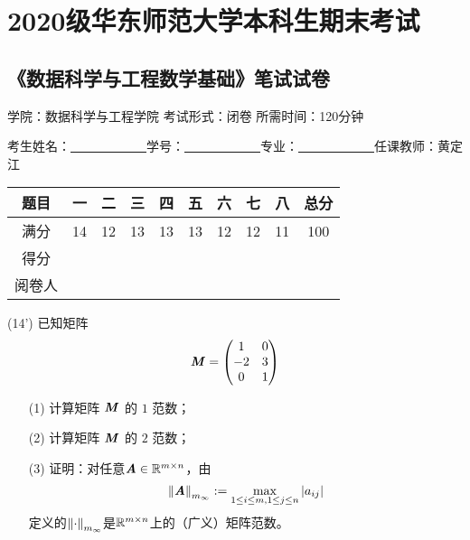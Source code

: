 \documentclass[12pt,a4paper,openany,twoside]{ctexbook}
\begin{document}
\setcounter{chapter}{1}
\chapter*{2020级华东师范大学本科生期末考试}
\section*{《数据科学与工程数学基础》笔试试卷 }
\begin{center}
	学院：数据科学与工程学院 \qquad 考试形式：闭卷 \qquad 所需时间：120分钟
\end{center}
\begin{center}
	考生姓名：\underline{~~~~~~}\underline{~~~~~~}\qquad 学号：\underline{~~~~~~}\underline{~~~~~~}\qquad 专业：\underline{~~~~~~}\underline{~~~~~~}\qquad 任课教师：黄定江
\end{center}
{ \begin{center}
		\begin{tabular}{|c|c|c|c|c|c|c|c|c|c|}
			\hline 
			题目 & 一 & 二 & 三 & 四 & 五 & 六 & 七 & 八&总分 \\ 
			\hline 
			满分 & 14 & 12 & 13 & 13 & 13 & 12 & 12 & 11 & 100  \\ 
			\hline 
			得分 &  &  &  &  &  &  &  & &  \\ 
			\hline 
			阅卷人 &  &  &  &  &  &  &  & &  \\ 
			\hline 
		\end{tabular} 
		
\end{center}}

\begin{exercise}(14')
	已知矩阵\[ \boldsymbol{\mathit{M}} = \begin{pmatrix}
		1&0\\
		-2&3\\
		0&1
	\end{pmatrix}
	\]
	\begin{itemize}
		\item [(1)] 计算矩阵 $\boldsymbol{\mathit{M}}$ 的 $1$ 范数；
		\item [(2)] 计算矩阵 $\boldsymbol{\mathit{M}}$ 的 $2$ 范数；
		\item [(3)] 证明：对任意$ \boldsymbol{\mathit{A}}\in\mathbb{R}^{m\times n} $，由
		\[ \left\lVert\boldsymbol{\mathit{A}}\right\rVert_{m_\infty} := \max_{1\leq i\leq m,1\leq j\leq n}\arrowvert a_{ij}\arrowvert \]
		定义的$ \left\lVert\cdot\right\rVert_{m_\infty} $是$ \mathbb{R}^{m\times n} $上的（广义）矩阵范数。
	\end{itemize}
\end{exercise}
\end{document}

